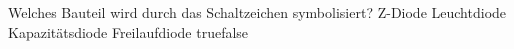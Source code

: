     {Welches Bauteil wird durch das Schaltzeichen symbolisiert?}
    {Z-Diode}
    {Leuchtdiode}
    {Kapazitätsdiode}
    {Freilaufdiode}
    {true}{false}